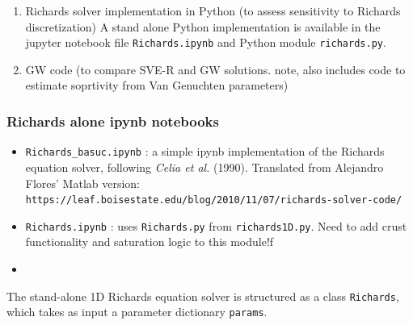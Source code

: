\documentclass{article}
\newcommand{\code}[1]{\texttt{#1}}
\begin{document}
\begin{enumerate}
	\item Richards solver implementation in Python (to assess sensitivity to Richards discretization) 
	\subitem  A stand alone Python implementation is available in the jupyter notebook file \code{Richards.ipynb} and Python module \code{richards.py}. 
 
	\item GW code (to compare SVE-R and GW solutions.  note, also includes code to estimate soprtivity from Van Genuchten parameters)
\end{enumerate}

\subsubsection*{Richards alone ipynb notebooks}
\begin{itemize}
	\item \code{Richards\_basuc.ipynb} : a simple ipynb implementation of the Richards equation solver, following \textit{Celia et al.} (1990).  Translated from Alejandro Flores' Matlab version:
	\subitem	\code{https://leaf.boisestate.edu/blog/2010/11/07/richards-solver-code/}
	\item \code{Richards.ipynb} : uses  \code{Richards.py} from \code{richards1D.py}.  Need to add crust functionality and saturation logic to this module!f
	\item 
\end{itemize}

The stand-alone 1D Richards equation solver is structured as a class \code{Richards}, which takes as input a parameter dictionary \code{params}. 




\end{document}
